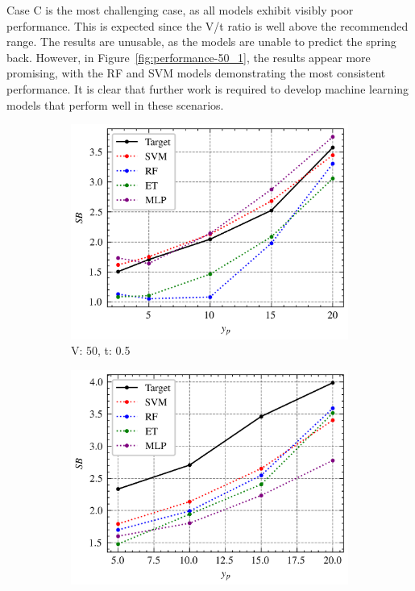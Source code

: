 Case C is the most challenging case, as all models exhibit visibly poor performance. This is expected since the V/t
ratio is well above the recommended range. The results are unusable, as the models are unable to predict the spring
back. However, in Figure~\ref{fig:performance-50_1}, the results appear more promising, with the RF and SVM models
demonstrating the most consistent performance. It is clear that further work is required to develop machine learning
models that perform well in these scenarios.

\begin{figure}[h]
    \begin{tcolorbox}[arc=0pt,boxrule=0.5pt]
        \begin{subfigure}{0.5\textwidth}
            \includegraphics[width=\textwidth]{chap5/images/performance_40_0.5}
            \caption{V: 50, t: 0.5}
            \label{fig:performance-50_0.5}
        \end{subfigure}
        \hfill
        \begin{subfigure}{0.5\textwidth}
            \includegraphics[width=\textwidth]{chap5/images/performance_50_0.5}

\end{subfigure}
\end{tcolorbox}
\end{figure}
